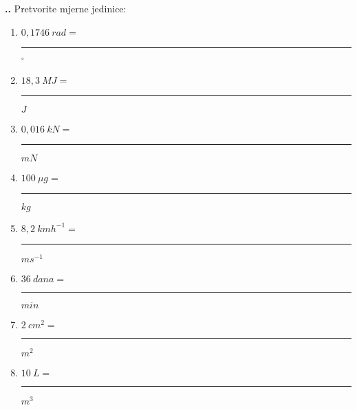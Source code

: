 \noindent 
\textbf{
\thecjelina.\thezadatak.}
Pretvorite mjerne jedinice:
\begin{enumerate}[label=\alph*)]
  \item $0,1746\ rad=$ \rule{3cm}{0.5pt} $ ^\circ $
  \item $18,3\ MJ =$ \rule{3cm}{0.5pt} $ J$
  \item $0,016\ kN =$ \rule{3cm}{0.5pt} $ mN$  
  \item $100\ \mu g= $ \rule{3cm}{0.5pt} $ kg$
  \item $8,2\ kmh^{-1} =$ \rule{3cm}{0.5pt} $ms^{-1}$
  \item $36\ dana =$ \rule{3cm}{0.5pt} $min $
  \item $2\ cm^2=$ \rule{3cm}{0.5pt} $m^2 $
  \item $10\ L =$ \rule{3cm}{0.5pt} $m^3$
\end{enumerate}

